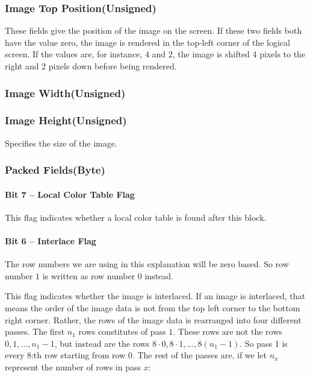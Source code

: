 \subsubsection{Image Top Position(Unsigned)}

These fields give the position of the image on the screen. If these
two fields both have the value zero, the image is rendered in the
top-left corner of the logical screen. If the values are, for
instance, $4$ and $2$, the image is shifted 4 pixels to the right and 2
pixels down before being rendered.

\subsubsection{Image Width(Unsigned)}
\subsubsection{Image Height(Unsigned)}

Specifies the size of the image.

\subsubsection{Packed Fields(Byte)}

\paragraph{Bit 7 -- Local Color Table Flag}

This flag indicates whether a local color table is found after this
block.


\paragraph{Bit 6 -- Interlace Flag}

The row numbers we are using in this explanation will be zero
based. So row number $1$ is written as row number $0$ instead.

This flag indicates whether the image is interlaced. If an image is
interlaced, that means the order of the image data is not from the top
left corner to the bottom right corner. Rather, the rows of the image
data is rearranged into four different passes. The first $n_1$ rows
constitutes of pass $1$. These rows are not the rows
$0,1,\dots,n_1-1$, but instead are the rows $8 \cdot 0, 8 \cdot 1,
\dots, 8(n_1-1)$. So pass 1 is every 8:th row starting from row
$0$. The rest of the passes are, if we let $n_x$ represent the number
of rows in pass $x$:


